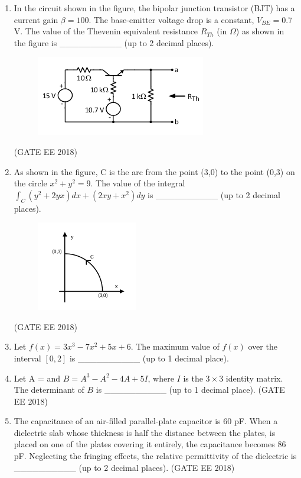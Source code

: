 \documentclass[journal,12pt,onecolumn]{IEEEtran}
\theoremstyle{remark}
\begin{document}
\begin{enumerate}
\item In the circuit shown in the figure, the bipolar junction transistor (BJT) has a current gain $\beta = 100$. The base-emitter voltage drop is a constant, $V_{BE} = 0.7$ V. The value of the Thevenin equivalent resistance $R_{Th}$ (in $\Omega$) as shown in the figure is \_\_\_\_\_\_\_\_\_\_ (up to 2 decimal places).
\begin{figure}[H]
    \centering
    \includegraphics[]{figs/Q.41.png}
    \caption{}
    \label{fig:17}
\end{figure}
\hfill{(GATE EE 2018)}

\item As shown in the figure, C is the arc from the point (3,0) to the point (0,3) on the circle $x^2 + y^2 = 9$. The value of the integral $\int_C (y^2 + 2yx)dx + (2xy + x^2)dy$ is \_\_\_\_\_\_\_\_\_\_ (up to 2 decimal places).
\begin{figure}[H]
    \centering
    \includegraphics[]{figs/Q.42.png}
    \caption{}
    \label{fig:18}
\end{figure}
\hfill{(GATE EE 2018)}

\item Let $f(x) = 3x^3 - 7x^2 + 5x + 6$. The maximum value of $f(x)$ over the interval $[0, 2]$ is \_\_\_\_\_\_\_\_\_\_ (up to 1 decimal place).

\item Let A = 
 and $B = A^3 - A^2 - 4A + 5I$, where $I$ is the $3 \times 3$ identity matrix. The determinant of $B$ is \_\_\_\_\_\_\_\_\_\_ (up to 1 decimal place).
 \hfill{(GATE EE 2018)}

\item The capacitance of an air-filled parallel-plate capacitor is 60 pF. When a dielectric slab whose thickness is half the distance between the plates, is placed on one of the plates covering it entirely, the capacitance becomes 86 pF. Neglecting the fringing effects, the relative permittivity of the dielectric is \_\_\_\_\_\_\_\_\_\_ (up to 2 decimal places).
\hfill{(GATE EE 2018)}


\end{enumerate}
\end{document}
